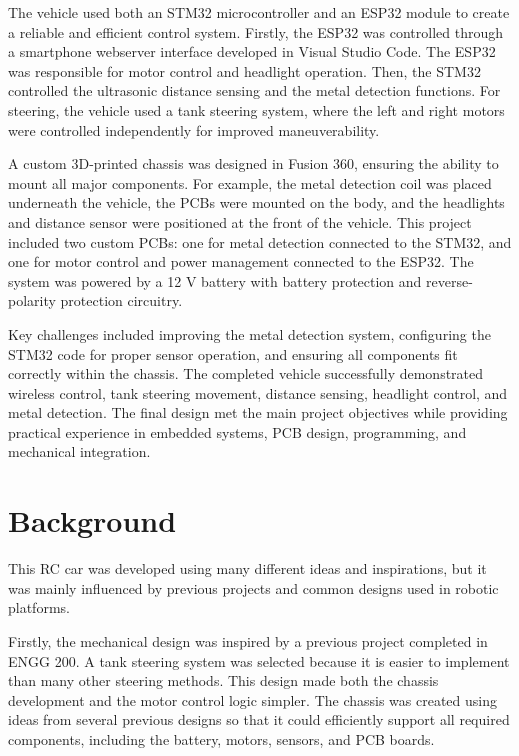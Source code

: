 \documentclass[11pt]{article}
\begin{document}
The vehicle used both an STM32 microcontroller and an ESP32 module to create a reliable and efficient control system. Firstly, the ESP32 was controlled through a smartphone webserver interface developed in Visual Studio Code. The ESP32 was responsible for motor control and headlight operation. Then, the STM32 controlled the ultrasonic distance sensing and the metal detection functions. For steering, the vehicle used a tank steering system, where the left and right motors were controlled independently for improved maneuverability.

A custom 3D-printed chassis was designed in Fusion 360, ensuring the ability to mount all major components. For example, the metal detection coil was placed underneath the vehicle, the PCBs were mounted on the body, and the headlights and distance sensor were positioned at the front of the vehicle. This project included two custom PCBs: one for metal detection connected to the STM32, and one for motor control and power management connected to the ESP32. The system was powered by a 12 V battery with battery protection and reverse-polarity protection circuitry.

Key challenges included improving the metal detection system, configuring the STM32 code for proper sensor operation, and ensuring all components fit correctly within the chassis. The completed vehicle successfully demonstrated wireless control, tank steering movement, distance sensing, headlight control, and metal detection. The final design met the main project objectives while providing practical experience in embedded systems, PCB design, programming, and mechanical integration.

\newpage

\section{Background}
This RC car was developed using many different ideas and inspirations, but it was mainly influenced by previous projects and common designs used in robotic platforms.

Firstly, the mechanical design was inspired by a previous project completed in ENGG 200. A tank steering system was selected because it is easier to implement than many other steering methods. This design made both the chassis development and the motor control logic simpler. The chassis was created using ideas from several previous designs so that it could efficiently support all required components, including the battery, motors, sensors, and PCB boards.
\end{document}
